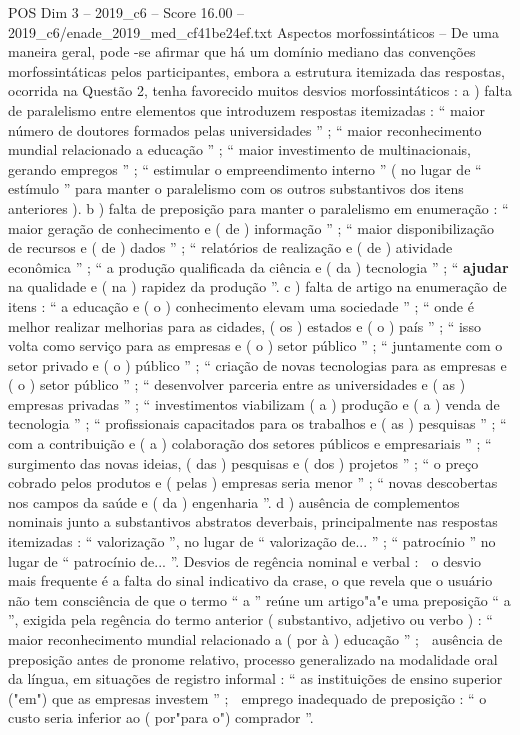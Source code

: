 \begin{textsample}{POS Dim 3 – 2019\_c6 – Score 16.00 – 2019\_c6/enade\_2019\_med\_cf41be24ef.txt}
Aspectos morfossintáticos – De uma maneira geral, pode -se afirmar que há um domínio mediano das convenções morfossintáticas pelos participantes, embora a estrutura itemizada das respostas, ocorrida na Questão 2, tenha favorecido muitos desvios morfossintáticos : a ) falta de paralelismo entre elementos que introduzem respostas itemizadas : “ maior número de doutores formados pelas universidades ” ; “ maior reconhecimento mundial relacionado a educação ” ; “ maior investimento de multinacionais, gerando empregos ” ; “ estimular o empreendimento interno ” ( no lugar de “ estímulo ” para manter o paralelismo com os outros substantivos dos itens anteriores ). b ) falta de preposição para manter o paralelismo em enumeração : “ maior geração de conhecimento e ( de ) informação ” ; “ maior disponibilização de recursos e ( de ) dados ” ; “ relatórios de realização e ( de ) atividade econômica ” ; “ a produção qualificada da ciência e ( da ) tecnologia ” ; “ \textbf{ajudar} na qualidade e ( na ) rapidez da produção ”. c ) falta de artigo na enumeração de itens : “ a educação e ( o ) conhecimento elevam uma sociedade ” ; “ onde é melhor realizar melhorias para as cidades, ( os ) estados e ( o ) país ” ; “ isso volta como serviço para as empresas e ( o ) setor público ” ; “ juntamente com o setor privado e ( o ) público ” ; “ criação de novas tecnologias para as empresas e ( o ) setor público ” ; “ desenvolver parceria entre as universidades e ( as ) empresas privadas ” ; “ investimentos viabilizam ( a ) produção e ( a ) venda de tecnologia ” ; “ profissionais capacitados para os trabalhos e ( as ) pesquisas ” ; “ com a contribuição e ( a ) colaboração dos setores públicos e empresariais ” ; “ surgimento das novas ideias, ( das ) pesquisas e ( dos ) projetos ” ; “ o preço cobrado pelos produtos e ( pelas ) empresas seria menor ” ; “ novas descobertas nos campos da saúde e ( da ) engenharia ”. d ) ausência de complementos nominais junto a substantivos abstratos deverbais, principalmente nas respostas itemizadas : “ valorização ”, no lugar de “ valorização de... ” ; “ patrocínio ” no lugar de “ patrocínio de... ”.
Desvios de regência nominal e verbal :  o desvio mais frequente é a falta do sinal indicativo da crase, o que revela que o usuário não tem consciência de que o termo “ a ” reúne um artigo"a"e uma preposição “ a ”, exigida pela regência do termo anterior ( substantivo, adjetivo ou verbo ) : “ maior reconhecimento mundial relacionado a ( por à ) educação ” ;  ausência de preposição antes de pronome relativo, processo generalizado na modalidade oral da língua, em situações de registro informal : “ as instituições de ensino superior ("em") que as empresas investem ” ;  emprego inadequado de preposição : “ o custo seria inferior ao ( por"para o") comprador ”.

\end{textsample}
